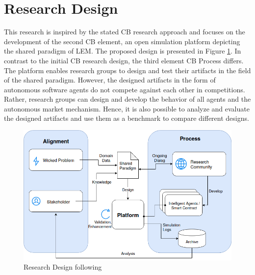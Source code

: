 \section{Research Design}
\label{sec:research_design}

This research is inspired by the stated CB research approach and focuses on the development of 
the second CB element, an open simulation platform depicting the shared paradigm of LEM. 
The proposed design is presented in Figure \ref{figure:competitive_benchmarking}. 
In contrast to the initial CB research design, the third element CB Process differs. 
The platform enables research groups to design and test their artifacts in the field of the shared 
paradigm. However, the designed artifacts in the form of autonomous 
software agents do not compete against each other in competitions. 
Rather, research groups can design and develop the behavior of all agents and the 
autonomous market mechanism. Hence, it is also possible to analyze and evaluate the designed 
artifacts and use them as a benchmark to compare different designs. 

\begin{figure}[htbp]
	\centering
	\includegraphics[width=1\linewidth]{./figures/competitive_benchmarking.png}
	\caption{Research Design following \protect{}}
	\label{figure:competitive_benchmarking}
\end{figure}


